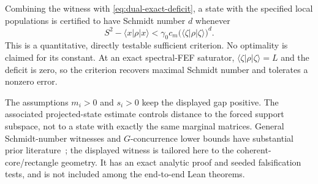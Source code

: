 Combining the witness with \eqref{eq:dual-exact-deficit}, a state with the
specified local populations is certified to have Schmidt number $d$ whenever
\[
 S^2-\langle x|\rho|x\rangle
 <\gamma_0c_m\bigl(\langle\zeta|\rho|\zeta\rangle\bigr)^d.
\]
This is a quantitative, directly testable sufficient criterion. No optimality
is claimed for its constant. At an exact spectral-FEF saturator,
$\langle\zeta|\rho|\zeta\rangle=L$ and the deficit is zero, so the
criterion recovers maximal Schmidt number and tolerates a nonzero error.


The assumptions $m_i>0$ and $s_i>0$ keep the displayed gap positive.
The associated projected-state estimate controls distance to the forced
support subspace, not to a state with exactly the same marginal matrices.
General Schmidt-number witnesses and $G$-concurrence lower bounds have
substantial prior literature~\cite{terhalhorodecki,sentis}; the displayed
witness is tailored here to the coherent-core/rectangle geometry.
It has an exact analytic proof and seeded falsification tests, and is
not included among the end-to-end Lean theorems.
